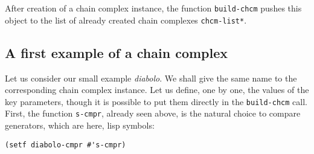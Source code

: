 After creation of a chain complex instance, the function {\tt build-chcm} pushes this
object to the list of already created chain complexes {\tt *chcm-list*}.

\subsection* {A first example of a chain complex}

Let us consider our small example {\em diabolo}. We shall give the same name to
the corresponding chain complex  instance.
Let us define, one by one, the values of the key parameters,
though it is possible to put them directly in the {\tt build-chcm} call.
First,  the function {\tt s-cmpr}, already seen above, is  the natural choice to compare
generators, which are here, lisp symbols:
{\footnotesize\begin{verbatim}
(setf diabolo-cmpr #'s-cmpr)
\end{verbatim}}

